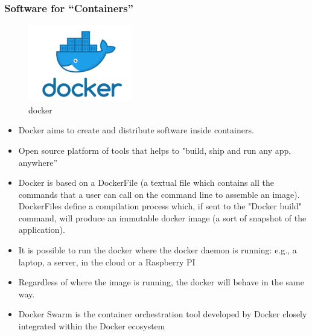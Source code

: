 \documentclass[10pt, oneside]{article}
\begin{document}
\subsubsection{Software for “Containers”}
\begin{multicols}{2}
    \begin{figure}[H]
        \begin{center}
        \includegraphics[width=0.4\textwidth]{img/img44.png}
        \caption{docker}
        \label{fig:docker}
        \end{center}
    \end{figure}
    \columnbreak
    \begin{itemize}
        \item Docker aims to create and distribute software inside containers.
        \item Open source platform of tools that helps to "build, ship and run
        any app, anywhere”
        \item Docker is based on a DockerFile (a textual file which contains all the commands that a user can call on the command line to assemble an image). DockerFiles define a compilation process which, if sent to the "Docker build" command, will produce an immutable docker image (a sort of snapshot of the application).
        \item It is possible to run the docker where the docker daemon is running: e.g., a laptop, a server, in the cloud or a Raspberry PI
        \item Regardless of where the image is running, the docker will behave in the same way.
        \item Docker Swarm is the container orchestration tool developed by Docker closely integrated within the Docker ecosystem
    \end{itemize}
\end{multicols}
\end{document}
